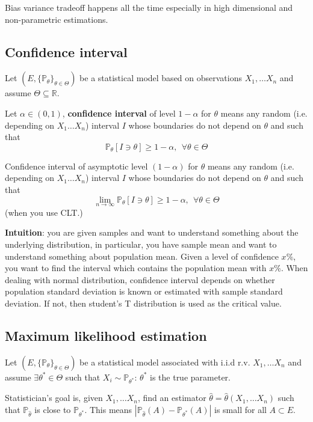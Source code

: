\documentclass{article}
\begin{document}
Bias variance tradeoff happens all the time especially in high dimensional and non-parametric estimations.

\subsection{Confidence interval}

Let $(E, \{\mathbb{P_{\theta}}\}_{\theta \in \Theta})$ be a statistical model based on observations $X_1, \dots X_n$ and assume $\Theta \subseteq \mathbb{R}$.

Let $\alpha \in (0, 1)$, \textbf{confidence interval} of level $1 - \alpha$ for $\theta$ means any random (i.e. depending on $X_1 \dots X_n$) interval $\mathit{I}$ whose boundaries do not depend on $\theta$ and such that
$$
\mathbb{P}_{\theta}[\mathit{I} \ni \theta] \geq 1 - \alpha, ~ ~ \forall \theta \in \Theta
$$

Confidence interval of asymptotic level $(1 - \alpha)$ for $\theta$ means any random (i.e. depending on $X_1 \dots X_n$) interval $\mathit{I}$ whose boundaries do not depend on $\theta$ and such that
$$
\lim_{n \to \infty} \mathbb{P}_{\theta}[\mathit{I} \ni \theta] \geq 1 - \alpha, ~ ~ \forall \theta \in \Theta
$$
(when you use CLT.)

\textbf{Intuition}: you are given samples and want to understand something about the underlying distribution, in particular, you have sample mean and want to understand something about population mean.
Given a level of confidence $x\%$, you want to find the interval which contains the population mean with $x\%$.
When dealing with normal distribution, confidence interval depends on whether population standard deviation is known or estimated with sample standard deviation. If not, then student's T distribution is used as the critical value.

\subsection{Maximum likelihood estimation}

Let $(E, \{\mathbb{P_{\theta}}\}_{\theta \in \Theta})$ be a statistical model associated with i.i.d r.v. $X_1, \dots X_n$ and assume $\exists \theta^* \in \Theta$ such that $X_i \sim \mathbb{P}_{\theta^*}$: $\theta^*$ is the true parameter.

Statistician's goal is, given $X_1, \dots X_n$, find an estimator $\hat{\theta} = \hat{\theta}(X_1, \dots X_n)$ such that $\mathbb{P}_{\hat{\theta}}$ is close to $\mathbb{P}_{\theta^*}$. This means
$|\mathbb{P}_{\hat{\theta}}(A) - \mathbb{P}_{\theta^*}(A)|$ is small for all $A \subset E$.
\end{document}
